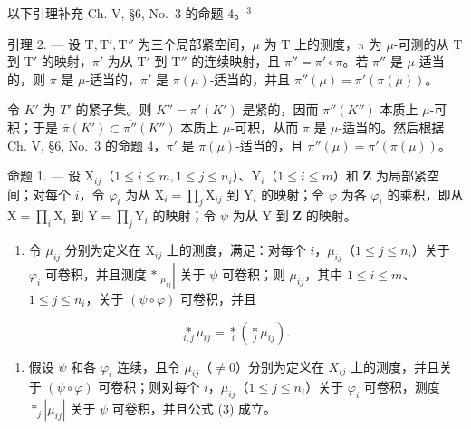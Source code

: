 以下引理补充 Ch. V, §6, No.~3 的命题 4。\(^{3}\)

引理 2. --- 设 \(\mathrm{T}, \mathrm{T}', \mathrm{T}''\) 为三个局部紧空间，\(\mu\) 为 \(\mathrm{T}\) 上的测度，\(\pi\) 为 \(\mu\)-可测的从 \(\mathrm{T}\) 到 \(\mathrm{T}'\) 的映射，\(\pi'\) 为从 \(\mathrm{T}'\) 到 \(\mathrm{T}''\) 的连续映射，且 \(\pi'' = \pi' \circ \pi\)。若 \(\pi''\) 是 \(\mu\)-适当的，则 \(\pi\) 是 \(\mu\)-适当的，\(\pi'\) 是 \(\pi(\mu)\)-适当的，并且 \(\pi''(\mu) = \pi' (\pi(\mu))\)。

令 \(K'\) 为 \(T'\) 的紧子集。则 \(K'' = \pi'(K')\) 是紧的，因而 \(\pi''(K'')\) 本质上 \(\mu\)-可积；于是 \(\overline{\pi}(K') \subset \overline{\pi''}(K'')\) 本质上 \(\mu\)-可积，从而 \(\pi\) 是 \(\mu\)-适当的。然后根据 Ch. V, §6, No.~3 的命题 4，\(\pi'\) 是 \(\pi(\mu)\)-适当的，且 \(\pi''(\mu) = \pi'(\pi(\mu))\)。

命题 1. --- 设 \(\mathrm{X}_{ij}\)（\(1 \leqslant i \leqslant m, 1 \leqslant j \leqslant n_i\)）、\(\mathrm{Y}_i\)（\(1 \leqslant i \leqslant m\)）和 \(\mathbf{Z}\) 为局部紧空间；对每个 \(i\)，令 \(\varphi_i\) 为从 \(\mathrm{X}_i = \prod_j \mathrm{X}_{ij}\) 到 \(\mathrm{Y}_i\) 的映射；令 \(\varphi\) 为各 \(\varphi_i\) 的乘积，即从 \(\mathrm{X} = \prod_i \mathrm{X}_i\) 到 \(\mathrm{Y} = \prod_j \mathrm{Y}_i\) 的映射；令 \(\psi\) 为从 \(\mathrm{Y}\) 到 \(\mathbf{Z}\) 的映射。

\begin{enumerate}
\def\labelenumi{(\roman{enumi})}
\tightlist
\item
  令 \(\mu_{ij}\) 分别为定义在 \(\mathrm{X}_{ij}\) 上的测度，满足：对每个 \(i\)，\(\mu_{ij}\)（\(1 \leqslant j \leqslant n_i\)）关于 \(\varphi_i\) 可卷积，并且测度 \(*|_{\mu_{ij}}|\) 关于 \(\psi\) 可卷积；则 \(\mu_{ij}\)，其中 \(1 \leqslant i \leqslant m\)、\(1 \leqslant j \leqslant n_i\)，关于 \((\psi \circ \varphi)\) 可卷积，并且
\end{enumerate}

\[
\underset {i, j} {\ast} \mu_ {i j} = \underset {i} {\ast} \left(\underset {j} {\ast} \mu_ {i j}\right).\tag{3}
\]

\begin{enumerate}
\def\labelenumi{(\roman{enumi})}
\setcounter{enumi}{1}
\tightlist
\item
  假设 \(\psi\) 和各 \(\varphi_{i}\) 连续，且令 \(\mu_{ij}\)（\(\neq 0\)）分别为定义在 \(X_{ij}\) 上的测度，并且关于 \((\psi \circ \varphi)\) 可卷积；则对每个 \(i\)，\(\mu_{ij}\)（\(1 \leqslant j \leqslant n_{i}\)）关于 \(\varphi_{i}\) 可卷积，测度 \(*_{j} |\mu_{ij}|\) 关于 \(\psi\) 可卷积，并且公式 (3) 成立。
\end{enumerate}

